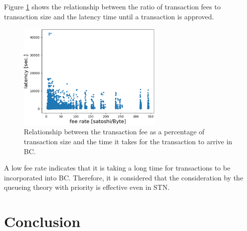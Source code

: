 \documentclass[graybox]{svmult}
\begin{document}
Figure \ref{fig:exp3-3} shows the relationship between the ratio of transaction fees to transaction size and the latency time until a transaction is approved. 
%
\begin{figure}[t]
  \begin{center}
    \includegraphics[width=70mm]{exp3-3.eps}
  \end{center}
  \caption{Relationship between the transaction fee as a percentage of transaction size and the time it takes for the transaction to arrive in BC.}
  \label{fig:exp3-3}
\end{figure}
%
A low fee rate indicates that it is taking a long time for transactions to be incorporated into BC.
Therefore, it is considered that the consideration by the queueing theory with priority is effective even in STN.



\section{Conclusion}
\label{sec:conclusion}
\end{document}
